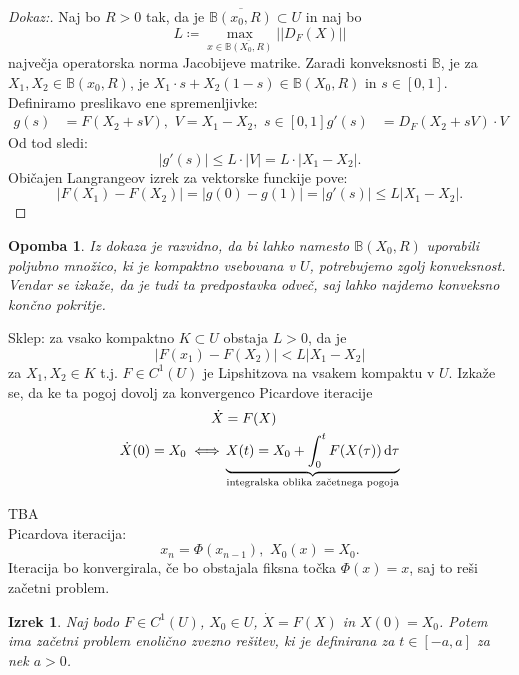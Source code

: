 \documentclass{article}
\newtheorem{opomba}{Opomba}
\newtheorem{izrek}{Izrek}
\begin{document}
\begin{proof}[Dokaz:]
    Naj bo $R > 0$ tak, da je $\overline{\mathbb{B}(x_0, R)} \subset U$
    in naj bo 
    $$
    L \coloneqq \max_{x\in \overline{\mathbb{B}(X_0, R)}} ||D_F(X)||
    $$
    največja operatorska norma Jacobijeve matrike. Zaradi konveksnosti $\mathbb{B}$, je za  $X_1, X_2 \in \mathbb{B}(x_0, R)$, je 
    $X_1 \cdot s + X_2(1 - s) \in \mathbb{B}(X_0, R)$ in $s\in [0, 1]$.
    Definiramo preslikavo ene spremenljivke:
    \begin{align*}
    g(s) &= F(X_2 + sV), \,\, V = X_1 - X_2, \,\, s\in [0, 1]
    g'(s) &= D_F(X_2 + sV) \cdot V
    \end{align*}
    Od tod sledi:
    $$
    |g'(s)| \leq L \cdot |V| = L\cdot |X_1 - X_2|.
    $$
    Običajen Langrangeov izrek za vektorske funckije pove:
    $$
    |F(X_1) - F(X_2)| = |g(0) - g(1)| = |g'(s)| \leq L |X_1 - X_2|.
    $$
\end{proof}

\begin{opomba}
Iz dokaza je razvidno, da bi lahko namesto $\mathbb{B}(X_0, R)$
uporabili poljubno množico, ki je kompaktno vsebovana v $U$, 
potrebujemo zgolj konveksnost. Vendar se izkaže, da je tudi ta predpostavka 
odveč, saj lahko najdemo konveksno končno pokritje.
\end{opomba}

Sklep: za vsako kompaktno $K \subset U$ obstaja $L > 0$, da je 
$$
|F(x_1) - F(X_2)| < L |X_1 - X_2|
$$
za $X_1, X_2 \in K$ t.j. $F\in C^1(U)$ je Lipshitzova na vsakem 
kompaktu v $U$. Izkaže se, da ke ta pogoj dovolj za konvergenco 
Picardove iteracije 
\begin{align*}
\dot{X} &= F(X) \\
\dot{X}(0) = X_0 \iff &\underbrace{X(t) = X_0 + \int_0^t F(X(\tau)) \dif \tau}_{\text{integralska oblika začetnega pogoja}} \\
\end{align*}

TBA\\[2mm]

Picardova iteracija:
$$
x_n = \Phi(x_{n-1}), \,\, X_0(x) = X_0.
$$
Iteracija bo konvergirala, če bo obstajala fiksna točka $\Phi(x) = x$,
saj to reši začetni problem.

\begin{izrek}
Naj bodo $F\in C^1(U)$, $X_0 \in U$, $\dot{X} = F(X)$ in $X(0) = X_0$.
Potem ima začetni problem enolično zvezno rešitev, ki je definirana 
za $t\in [-a, a]$ za nek $a > 0$.
\end{izrek}
\end{document}
